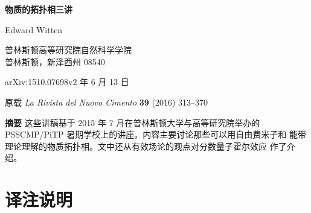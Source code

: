 \documentclass[11pt,a4paper]{article}
\numberwithin{equation}{section}
\begin{document}
\begin{titlepage}
  \centering
  \vspace*{2.2cm}

  {\LARGE\bfseries 物质的拓扑相三讲\par}

  \vspace{1.6cm}

  {\large Edward Witten\par}

  \vspace{0.8cm}

  {\small 普林斯顿高等研究院自然科学学院\\
  普林斯顿，新泽西州 08540\par}

  \vspace{1.8cm}

  {\small arXiv:1510.07698v2 年 6 月 13 日\par}

  \vspace{0.4cm}

  {\small 原载 \textit{La Rivista del Nuovo Cimento} \textbf{39} (2016) 313--370\par}

  \vfill

  \begin{minipage}{0.86\textwidth}
    \small
    \noindent\textbf{摘要}\quad
    这些讲稿基于 2015 年 7 月在普林斯顿大学与高等研究院举办的
    PSSCMP/PiTP 暑期学校上的讲座。内容主要讨论那些可以用自由费米子和
    能带理论理解的物质拓扑相。文中还从有效场论的观点对分数量子霍尔效应
    作了介绍。
  \end{minipage}

  \vspace{1.2cm}
\end{titlepage}

\thispagestyle{empty}
\tableofcontents
\clearpage

\setcounter{page}{1}
\setcounter{section}{-1}

\section*{译注说明}
\end{document}
